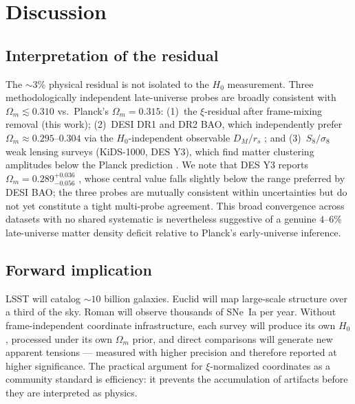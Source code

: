 \documentclass[usenatbib]{mnras}
\begin{document}
\section{Discussion}

\subsection{Interpretation of the residual}

The $\sim$3\% physical residual is not isolated to the $H_0$ measurement.
Three methodologically independent late-universe probes are broadly
consistent with $\Omega_m \lesssim 0.310$ vs.\ Planck's $\Omega_m = 0.315$:
(1)~the $\xi$-residual after frame-mixing removal (this work);
(2)~DESI DR1 and DR2 BAO, which independently prefer
$\Omega_m \approx 0.295$--$0.304$ via the $H_0$-independent observable
$D_M/r_s$ \citep{desi2024,desi2025}; and (3)~$S_8/\sigma_8$ weak lensing surveys
(KiDS-1000, DES Y3), which find matter clustering amplitudes below the
Planck prediction \citep{heymans2021,amon2022}. We note that DES Y3
reports $\Omega_m = 0.289^{+0.036}_{-0.056}$ \citep{amon2022}, whose
central value falls slightly below the range preferred by DESI BAO;
the three probes are mutually consistent within uncertainties but do
not yet constitute a tight multi-probe agreement. This broad convergence
across datasets with no shared systematic is nevertheless suggestive of
a genuine $4$--$6$\% late-universe matter density deficit relative to
Planck's early-universe inference.

\subsection{Forward implication}

LSST will catalog $\sim10$ billion galaxies. Euclid will map large-scale
structure over a third of the sky. Roman will observe thousands of SNe~Ia
per year. Without frame-independent coordinate infrastructure, each survey
will produce its own $H_0$, processed under its own $\Omega_m$ prior, and
direct comparisons will generate new apparent tensions --- measured with
higher precision and therefore reported at higher significance. The practical
argument for $\xi$-normalized coordinates as a community standard is
efficiency: it prevents the accumulation of artifacts before they are
interpreted as physics.

\end{document}
